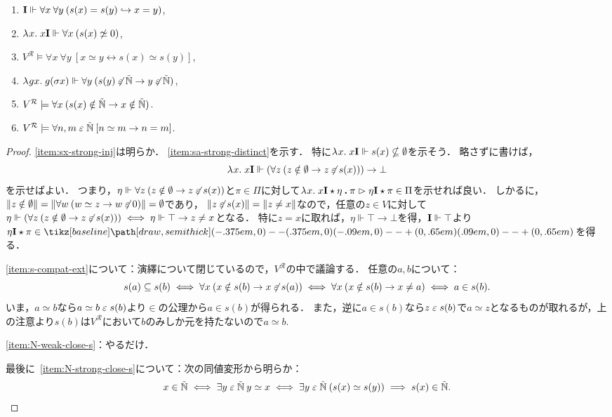 \documentclass[realisability.tex]{subfiles}
\begin{document}
\begin{lemma}\label{lem:s-0-compat}
 \begin{enumerate}
  \item \label{item:sx-strong-inj}$\mathsf{\mathbf{I}} \Vdash \forall x \: \forall y \: (s(x) = s(y) \hookrightarrow x = y)$,
  \item \label{item:sa-strong-distinct}$\lambda^{\mathsf{}}x.\;x\mathsf{\mathbf{I}} \Vdash \forall x \: (s(x) \not\simeq 0)$,
  \item \label{item:s-compat-ext}$V^{\mathcal{R}} \models \forall x\: \forall y \: [x \simeq y \leftrightarrow s(x) \simeq s(y)]$,
  \item \label{item:N-weak-close-s} $\lambda^{\mathsf{}}g x.\;g(\sigma x) \Vdash \forall y \: (s(y) \not\mathrel{\varepsilon} \mathord{\tilde{\mathbb{N}}} \to y \not\mathrel{\varepsilon} \mathord{\tilde{\mathbb{N}}}) $,
  \item \label{item:N-strong-close-s}$V^{\mathcal{R}} \models \forall x \: (s(x) \notin \mathord{\tilde{\mathbb{N}}} \to x \notin \mathord{\tilde{\mathbb{N}}})$.
  \item \label{item:nat-ext-to-int}$V^{\mathcal{R}} \models \forall n, m \mathrel{\varepsilon} \mathord{\tilde{\mathbb{N}}}\:[n \simeq m \to n = m]$.
 \end{enumerate}
\end{lemma}
\begin{proof}
 \ref{item:sx-strong-inj}は明らか．
 \ref{item:sa-strong-distinct}を示す．
 特に$\lambda^{\mathsf{}}x.\;x \mathsf{\mathbf{I}} \Vdash s(x) \nsubseteq \emptyset$を示そう．
 略さずに書けば，
 \[
  \lambda^{\mathsf{}}x.\;x \mathsf{\mathbf{I}} \Vdash (\forall z \: (z \notin \emptyset \to z \not\mathrel{\varepsilon} s(x))) \to \bot
 \]
 を示せばよい．
 つまり，$\eta \Vdash \forall z \: (z \notin \emptyset \to z \not\mathrel{\varepsilon} s(x))$と$\pi \in \Pi$に対して$\lambda^{\mathsf{}}x.\;x \mathsf{\mathbf{I}} \mathbin{\star} \eta \mathbin{\boldsymbol{.}} \pi \mathrel{\rhd} \eta \mathsf{\mathbf{I}} \mathbin{\star} \pi \in \Pi$を示せれば良い．
 しかるに，$\|z \notin \emptyset\| = \|\forall w\: (w \simeq z \to w \not\mathrel{\varepsilon} 0)\| = \emptyset$であり，
 $\|z \not\mathrel{\varepsilon} s(x)\| = \| z \neq x \|$なので，任意の$z \in V$に対して$\eta \Vdash (\forall z \: (z \notin \emptyset \to z \not\mathrel{\varepsilon} s(x))) \iff \eta \Vdash \top \to z \neq x$となる．
 特に$z = x$に取れば，$\eta \Vdash \top \to \bot$を得，$\mathsf{\mathbf{I}} \Vdash \top$より$\eta \I \cons \pi \in \pole$を得る．

 \ref{item:s-compat-ext}について：演繹について閉じているので，$V^{\mathcal{R}}$の中で議論する．
 任意の$a, b$について：
 \[ s(a) \subseteq s(b)
 \iff \forall x\: (x \notin s(b) \to x \not\mathrel{\varepsilon} s(a))
 \iff \forall x\: (x \notin s(b) \to x \neq a)
 \iff a \in s(b).
 \]
 いま，$a \simeq b$なら$a \simeq b \mathrel{\varepsilon} s(b)$より${\in}$の公理から$a \in s(b)$が得られる．
 また，逆に$a \in s(b)$なら$z \mathrel{\varepsilon} s(b)$で$a \simeq z$となるものが取れるが，上の注意より$s(b)$は$V^{\mathcal{R}}$において$b$のみしか元を持たないので$a \simeq b$.

 \ref{item:N-weak-close-s}：やるだけ．

 最後に~\ref{item:N-strong-close-s}について：次の同値変形から明らか：
 \[
       x \in \mathord{\tilde{\mathbb{N}}}
 \iff \exists y \mathrel{\varepsilon} \mathord{\tilde{\mathbb{N}}} \: y \simeq x
 \iff \exists y \mathrel{\varepsilon} \mathord{\tilde{\mathbb{N}}} \: (s(x) \simeq s(y))
 \implies s(x) \in \mathord{\tilde{\mathbb{N}}}.
 \]
\end{proof}
\end{document}
